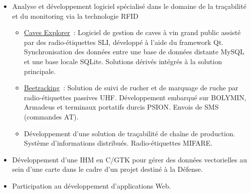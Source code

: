 \documentclass[12pt,a4paper,sans]{moderncv}
\begin{document}
{\begin{itemize}
\begin{itemize}
		      	      cartes)
		      	\item Décodage/encodage de pistes magnétiques
		      	\item Programmation par interruptions
		      	\item Protocole de communication série (basé sur HDLC)
		      	\item Recettes de construction automatique de fichiers CMake
		      	\item Intégration Continue via Jenkins
		      \end{itemize}
		\item Analyse et développement logiciel spécialisé dans le domaine
		      de la traçabilité et du monitoring via la technologie RFID
		      \begin{itemize}
		      	\item \href{http://www.caves-explorer.com/}{Caves Explorer}~:
		      	      Logiciel de gestion de caves à vin grand public assisté
		      	      par des radio-étiquettes SLI, développé à l'aide du
		      	      framework Qt.
		      	      Synchronisation des données entre une base de données
		      	      distante MySQL et une base locale SQLite.
		      	      Solutions dérivés intégrés à la solution principale.
		      	\item \href{http://www.beetracking.com/}{Beetracking}~:
		      	      Solution de suivi de rucher et de marquage de ruche par
		      	      radio-étiquettes passives {UHF}.
		      	      Développement embarqué sur BOLYMIN, Armadeus et terminaux
		      	      portatifs durcis {PSION}.
		      	      Envois de SMS (commandes AT).
		      	\item
		      	      Développement d'une solution de traçabilité de chaîne de
		      	      production.
		      	      Système d'informations distribués.
		      	      Radio-étiquettes {MIFARE}.
		      \end{itemize}
		\item Développement d'une IHM en C/GTK pour gérer des données
		      vectorielles au sein d'une carte dans le cadre d'un projet destiné
		      à la Défense.
		\item Participation au développement d'applications Web.
	\end{itemize}}


\end{document}
